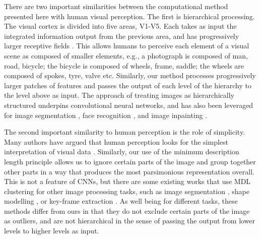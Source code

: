 \documentclass[a4paper,fleqn]{cas-sc}
\theoremstyle{remark}
\begin{document}
There are two important similarities between the computational method presented here with human visual perception. The first is hierarchical processing. The visual cortex is divided into five areas, V1-V5. Each takes as input the integrated information output from the previous area, and has progressively larger receptive fields \citep{huff2021neuroanatomy}. This allows humans to perceive each element of a visual scene as composed of smaller elements, e.g., a photograph is composed of man, road, bicycle; the bicycle is composed of wheels, frame, saddle; the wheels are composed of spokes, tyre, valve etc. Similarly, our method processes progressively larger patches of features and passes the output of each level of the hierarchy to the level above as input. %
The approach of treating images as hierarchically structured underpins convolutional neural networks, and has also been leveraged for image segmentation \citep{passat2011interactive}, face recognition \citep{geng2011face}, and  image inpainting \citep{zhang2023fully}.

The second important similarity to human perception is the role of simplicity. Many authors have argued that human perception looks for the simplest interpretation of visual data \citep{chater2005minimum,feldman2016simplicity,sims2016rate}.
Similarly, our use of the minimum description length principle allows us to ignore certain parts of the image and group together other parts in a way that produces the most parsimonious representation overall. This is not a feature of CNNs, but there are some existing works that use MDL clustering for other image processing tasks, such as image segmentation \citep{yang2008unsupervised}, shape modelling \citep{davies2002minimum}, or key-frame extraction \citep{gibson2002visual}. As well being for different tasks, these methods differ from ours in that they do not exclude certain parts of the image as outliers, and are not hierarchical in the sense of passing the output from lower levels to higher levels as input.
\end{document}
